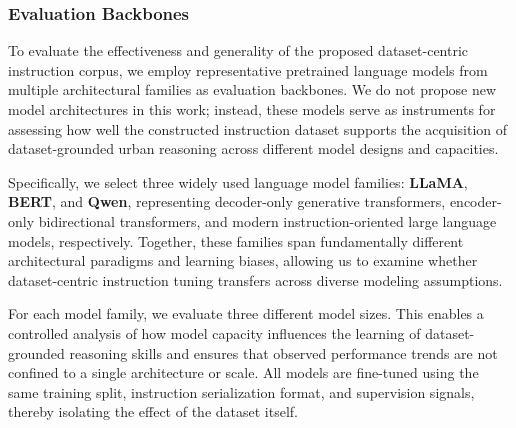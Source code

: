 \documentclass[a4paper,fleqn]{cas-sc}
\begin{document}
\subsubsection{Evaluation Backbones}

To evaluate the effectiveness and generality of the proposed dataset-centric instruction corpus, we employ representative pretrained language models from multiple architectural families as evaluation backbones.
We do not propose new model architectures in this work; instead, these models serve as instruments for assessing how well the constructed instruction dataset supports the acquisition of dataset-grounded urban reasoning across different model designs and capacities.

Specifically, we select three widely used language model families: \textbf{LLaMA}, \textbf{BERT}, and \textbf{Qwen}, representing decoder-only generative transformers, encoder-only bidirectional transformers, and modern instruction-oriented large language models, respectively.
Together, these families span fundamentally different architectural paradigms and learning biases, allowing us to examine whether dataset-centric instruction tuning transfers across diverse modeling assumptions.

For each model family, we evaluate three different model sizes.
This enables a controlled analysis of how model capacity influences the learning of dataset-grounded reasoning skills and ensures that observed performance trends are not confined to a single architecture or scale.
All models are fine-tuned using the same training split, instruction serialization format, and supervision signals, thereby isolating the effect of the dataset itself.
\end{document}
